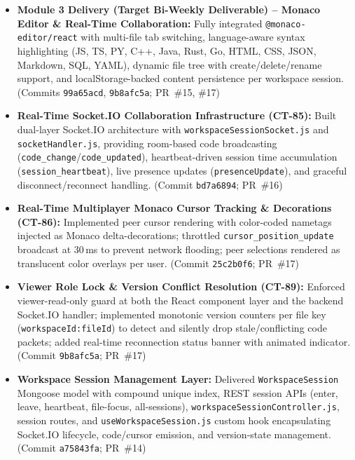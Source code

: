 \documentclass[11pt,a4paper]{article}
\begin{document}
\begin{itemize}
    \item \textbf{Module 3 Delivery (Target Bi-Weekly Deliverable) -- Monaco Editor \& Real-Time Collaboration:} Fully integrated \texttt{@monaco-editor/react} with multi-file tab switching, language-aware syntax highlighting (JS, TS, PY, C++, Java, Rust, Go, HTML, CSS, JSON, Markdown, SQL, YAML), dynamic file tree with create/delete/rename support, and localStorage-backed content persistence per workspace session. (Commits \texttt{99a65acd}, \texttt{9b8afc5a}; PR~\#15, \#17)

    \item \textbf{Real-Time Socket.IO Collaboration Infrastructure (CT-85):} Built dual-layer Socket.IO architecture with \texttt{workspaceSessionSocket.js} and \texttt{socketHandler.js}, providing room-based code broadcasting (\texttt{code\_change}/\texttt{code\_updated}), heartbeat-driven session time accumulation (\texttt{session\_heartbeat}), live presence updates (\texttt{presenceUpdate}), and graceful disconnect/reconnect handling. (Commit \texttt{bd7a6894}; PR~\#16)

    \item \textbf{Real-Time Multiplayer Monaco Cursor Tracking \& Decorations (CT-86):} Implemented peer cursor rendering with color-coded nametags injected as Monaco delta-decorations; throttled \texttt{cursor\_position\_update} broadcast at 30\,ms to prevent network flooding; peer selections rendered as translucent color overlays per user. (Commit \texttt{25c2b0f6}; PR~\#17)

    \item \textbf{Viewer Role Lock \& Version Conflict Resolution (CT-89):} Enforced viewer-read-only guard at both the React component layer and the backend Socket.IO handler; implemented monotonic version counters per file key (\texttt{workspaceId:fileId}) to detect and silently drop stale/conflicting code packets; added real-time reconnection status banner with animated indicator. (Commit \texttt{9b8afc5a}; PR~\#17)

    \item \textbf{Workspace Session Management Layer:} Delivered \texttt{WorkspaceSession} Mongoose model with compound unique index, REST session APIs (enter, leave, heartbeat, file-focus, all-sessions), \texttt{workspaceSessionController.js}, session routes, and \texttt{useWorkspaceSession.js} custom hook encapsulating Socket.IO lifecycle, code/cursor emission, and version-state management. (Commit \texttt{a75843fa}; PR~\#14)


\end{itemize}
\end{document}
